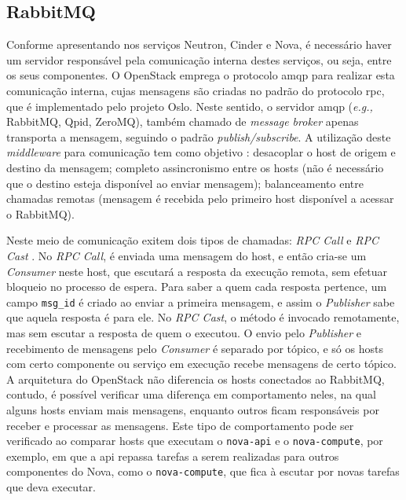\subsection{RabbitMQ}

Conforme apresentando nos serviços Neutron, Cinder e Nova, é necessário haver um servidor responsável pela comunicação interna destes serviços, ou seja, entre os seus componentes.
%
O OpenStack emprega o protocolo \ac{amqp} para realizar esta comunicação interna, cujas mensagens são criadas no padrão do protocolo \acf{rpc}, que é implementado pelo projeto Oslo.
%
Neste sentido, o servidor \ac{amqp} (\textit{e.g.,} RabbitMQ, Qpid, ZeroMQ), também chamado de \textit{message broker} apenas transporta a mensagem, seguindo o padrão \textit{publish/subscribe}.
%
A utilização deste \textit{middleware} para comunicação tem como objetivo \cite{openstack:amqp_cinder}: desacoplar o host de origem e destino da mensagem; completo assincronismo entre os hosts (não é necessário que o destino esteja disponível ao enviar mensagem); balanceamento entre chamadas remotas (mensagem é recebida pelo primeiro host disponível a acessar o RabbitMQ). 

Neste meio de comunicação exitem dois tipos de chamadas: \textit{RPC Call} e \textit{RPC Cast} \cite{openstack:amqp_cinder, openstack:amqp_nova}.
%
No \textit{RPC Call}, é enviada uma mensagem do host, e então cria-se um \textit{Consumer} neste host, que escutará a resposta da execução remota, sem efetuar bloqueio no processo de espera.
%
Para saber a quem cada resposta pertence, um campo \texttt{msg\_id} é criado ao enviar a primeira mensagem, e assim o \textit{Publisher} sabe que aquela resposta é para ele.
%
No \textit{RPC Cast}, o método é invocado remotamente, mas sem escutar a resposta de quem o executou.
%
O envio pelo \textit{Publisher} e recebimento de mensagens pelo \textit{Consumer} é separado por tópico, e só os hosts com certo componente ou serviço em execução recebe mensagens de certo tópico.
%
A arquitetura do OpenStack não diferencia os hosts conectados ao RabbitMQ, contudo, é possível verificar uma diferença em comportamento neles, na qual alguns hosts enviam mais mensagens, enquanto outros ficam responsáveis por receber e processar as mensagens.
%
Este tipo de comportamento pode ser verificado ao comparar hosts que executam o \texttt{nova-api} e o \texttt{nova-compute}, por exemplo, em que a \ac{api} repassa tarefas a serem realizadas para outros componentes do Nova, como o \texttt{nova-compute}, que fica à escutar por novas tarefas que deva executar.

